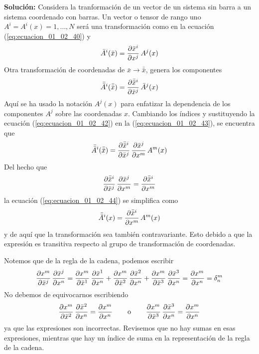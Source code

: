 \documentclass[hidelinks,12pt]{article}
\begin{document}
\noindent
\textbf{Solución: } Considera la tranformación de un vector de un sistema sin barra a un sistema coordenado con barras. Un vector o tensor de rango uno \break \hfill $A^{i} = A^{i} (x) = 1, \ldots, N$ será una transformación como en la ecuación (\ref{eq:ecuacion_01_02_40}) y
\begin{align}
    \bar{A}^{i} (\bar{x}) = \pdv{\bar{x}^{i}}{x^{j}} \, A^{j} (x)
    \label{eq:ecuacion_01_02_42}
\end{align}
Otra transformación de coordenadas de $\bar{x} \to \bar{\bar{x}}$, genera los componentes
\begin{align}
    \bar{\bar{A}}^{i} (\bar{\bar{x}}) = \pdv{\bar{\bar{x}}^{i}}{\bar{x}^{j}} \, \bar{A}^{j} (x)
    \label{eq:ecuacion_01_02_43}
\end{align}
Aquí se ha usado la notación $A^{j} (x)$ para enfatizar la dependencia de los componentes $A^{j}$ sobre las coordenadas $x$. Cambiando los índices y sustituyendo la ecuación (\ref{eq:ecuacion_01_02_42}) en la (\ref{eq:ecuacion_01_02_43}), se encuentra que
\begin{align}
    \bar{\bar{A}}^{i} (\bar{\bar{x}}) = \pdv{\bar{\bar{x}}^{i}}{\bar{x}^{j}} \, \pdv{\bar{x}^{j}}{x^{m}} \, A^{m} (x)
    \label{eq:ecuacion_01_02_44}
\end{align}
Del hecho que
\begin{align*}
    \pdv{\bar{\bar{x}}^{i}}{\bar{x}^{j}} \, \pdv{\bar{x}^{j}}{x^{m}} = \pdv{\bar{\bar{x}}^{i}}{x^{m}}
\end{align*}
la ecuación (\ref{eq:ecuacion_01_02_44}) se simplifica como
\begin{align}
    \bar{\bar{A}}^{i} (x) = \pdv{\bar{\bar{x}}^{i}}{x^{m}} \, A^{m} (x)
    \label{eq:ecuacion_01_02_45}
\end{align}
y de aquí que la transformación sea también contravariante. Esto debido a que la expresión es transitiva respecto al grupo de transformación de coordenadas.
\par
Notemos que de la regla de la cadena, podemos escribir
\begin{align*}
    \pdv{x^{m}}{\bar{x}^{j}} \, \pdv{\bar{x}^{j}}{x^{n}} = \pdv{x^{m}}{\bar{x}^{1}} \, \pdv{\bar{x}^{1}}{x^{n}} +  \pdv{x^{m}}{\bar{x}^{2}} \, \pdv{\bar{x}^{2}}{x^{n}} + \pdv{x^{m}}{\bar{x}^{3}} \, \pdv{\bar{x}^{3}}{x^{n}} = \pdv{x^{m}}{x^{n}} = \delta_{n}^{m}
\end{align*}
No debemos de equivocarnos escribiendo
\begin{align*}
    \pdv{x^{m}}{\bar{x}^{2}} \, \pdv{\bar{x}^{2}}{x^{n}} = \pdv{x^{m}}{x^{n}} \hspace{0.75cm} \text{o} \hspace{0.75cm} \pdv{x^{m}}{\bar{x}^{3}} \, \pdv{\bar{x}^{3}}{x^{n}} = \pdv{x^{m}}{x^{n}}
\end{align*}
ya que las expresiones son incorrectas. Revisemos que no hay sumas en esas expresiones, mientras que hay un índice de suma en la representación de la regla de la cadena.
\end{document}
